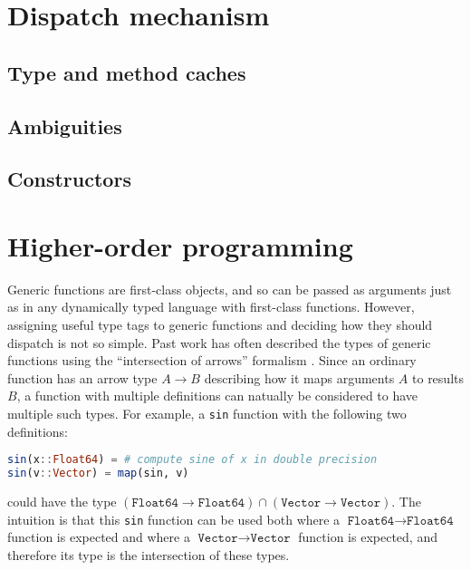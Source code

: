 \section{Dispatch mechanism}

\subsection{Type and method caches}

\subsection{Ambiguities}

\subsection{Constructors}


\section{Higher-order programming}

Generic functions are first-class objects, and so can be passed as arguments
just as in any dynamically typed language with first-class functions.
However, assigning useful type tags to generic functions and deciding how
they should dispatch is not so simple. Past work has often described the
types of generic functions using the ``intersection of arrows'' formalism
\cite{RonchiDellaRocca:1988:PTS:55079.55086} \cite{Dunfield:2012:EIU:2364527.2364534}
\cite{boundedquant} \cite{Castagna:1995:COF:203496.203510}. Since an ordinary
function has an arrow type $A\rightarrow B$ describing how it maps arguments
$A$ to results $B$, a function with multiple definitions can natually be
considered to have multiple such types. For example, a \texttt{sin} function
with the following two definitions:

\begin{singlespace}
\begin{lstlisting}[language=julia]
sin(x::Float64) = # compute sine of x in double precision
sin(v::Vector) = map(sin, v)
\end{lstlisting}
\end{singlespace}

\noindent
could have the type $(\texttt{Float64}\rightarrow\texttt{Float64})\cap(\texttt{Vector}\rightarrow\texttt{Vector})$. The intuition is that this \texttt{sin} function can be
used both where a $\texttt{Float64}\rightarrow\texttt{Float64}$ function
is expected and where a $\texttt{Vector}\rightarrow\texttt{Vector}$ function is expected,
and therefore its type is the intersection of these types.

